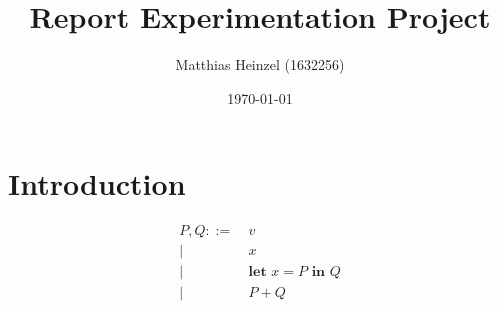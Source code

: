 \documentclass[11pt,a4paper]{article}
\title{Report Experimentation Project}
\author{Matthias Heinzel (1632256)}
\date{\today}
\begin{document}

\section{Introduction}

\begin{align*}
  P, Q ::=&\ v
  \\ \big|&\ x
  \\ \big|&\ \textbf{let } x = P \textbf{ in } Q
  \\ \big|&\ P + Q
\end{align*}


\end{document}
